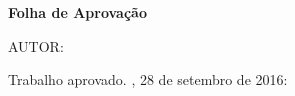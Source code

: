%
% 
%
\begin{folhadeaprovacao}
	\begin{center}
		\textbf{Folha de Aprovação}
		\vfill
		
		AUTOR: \MakeUppercase{\imprimirautor}
				
		\vfill
		\imprimirtitulo
		\vfill
		
		\hspace{.45\textwidth}
		\begin{minipage}{.5\textwidth}
			\imprimirpreambulo
		\end{minipage}%
		\vfill
	    
		Trabalho aprovado. \imprimirlocal, 28 de setembro de 2016:
	\end{center}
	
	
\end{folhadeaprovacao}